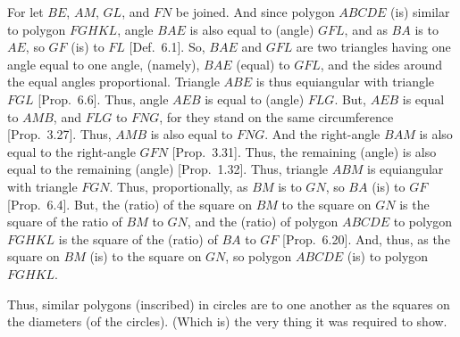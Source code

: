 \begin{Parallel}{}{}
{For let $BE$, $AM$, $GL$, and $FN$ be joined. And since polygon
$ABCDE$ (is) similar to polygon $FGHKL$, angle $BAE$ is also equal to
(angle) $GFL$, and as $BA$ is to $AE$, so $GF$ (is) to  $FL$ [Def.~6.1]. So, $BAE$ and $GFL$ are two triangles having one angle
equal to one angle, (namely), $BAE$ (equal) to $GFL$, and the sides
around the equal angles proportional. Triangle $ABE$ is thus equiangular with
triangle $FGL$ [Prop.~6.6]. Thus, angle $AEB$ is equal to
(angle) $FLG$. But, $AEB$ is equal to $AMB$, and $FLG$ to $FNG$, for they stand on the same
circumference [Prop.~3.27].
Thus, $AMB$ is also equal to $FNG$. And the right-angle $BAM$ is also
equal to the right-angle $GFN$ [Prop.~3.31]. 
Thus, the remaining (angle) is also equal to the remaining (angle) [Prop.~1.32]. Thus,
triangle $ABM$ is equiangular with triangle $FGN$. Thus, proportionally, as $BM$
is to $GN$, so $BA$ (is) to $GF$ [Prop.~6.4]. But, 
the (ratio) of the square on $BM$ to the square
on $GN$ is the square of the
ratio of $BM$ to $GN$, and  the (ratio) of
polygon $ABCDE$ to polygon $FGHKL$ is the square of the (ratio) of $BA$ to $GF$ [Prop.~6.20].  
And, thus, as the square on $BM$ (is) to the square on $GN$, so polygon $ABCDE$
(is) to polygon $FGHKL$. 

Thus, similar polygons (inscribed) in circles are to one another
as the squares on the diameters (of the circles). (Which is) the very thing it was required to
show.}
\end{Parallel}

